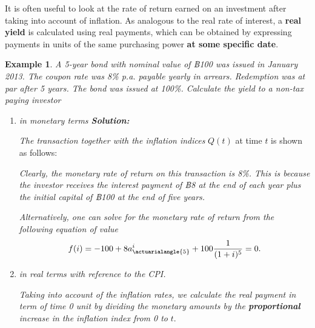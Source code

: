 \documentclass[
]{book}
\theoremstyle{definition}
\theoremstyle{definition}
\newtheorem{example}{Example}[chapter]
\theoremstyle{definition}
\theoremstyle{definition}
\theoremstyle{remark}
\begin{document}
It is often useful to look at the rate of return earned on an investment
after taking into account of inflation. As analogous to the real rate of
interest, a \textbf{real yield} is calculated using real payments, which can
be obtained by expressing payments in units of the same purchasing power
\textbf{at some specific date}.

\begin{example}
\emph{A 5-year bond with nominal value of ฿100 was issued in January 2013.
The coupon rate was 8\% p.a. payable yearly in arrears. Redemption was at
par after 5 years. The bond was issued at 100\%. Calculate the yield to a
non-tax paying investor}

\begin{enumerate}
\def\labelenumi{\arabic{enumi}.}
\item
  \emph{in monetary terms \textbf{Solution:}}

  \emph{The transaction together with the inflation indices} \(Q(t)\) at time
  \(t\) is shown as follows:

  \emph{Clearly, the monetary rate of return on this transaction is 8\%.
  This is because the investor receives the interest payment of ฿8 at
  the end of each year plus the initial capital of ฿100 at the end of
  five years.}

  \emph{Alternatively, one can solve for the monetary rate of return from
  the following equation of value}
  \[f(i) = -100 + 8 a^i_{\actuarialangle{5}} + 100\frac{1}{(1+i)^5} = 0.\]
\item
  \emph{in real terms with reference to the CPI.}

  \emph{Taking into account of the inflation rates, we calculate the real
  payment in term of time 0 unit by dividing the monetary amounts by
  the \textbf{proportional} increase in the inflation index from 0 to} \(t\).
\end{enumerate}


\end{example}
\end{document}
